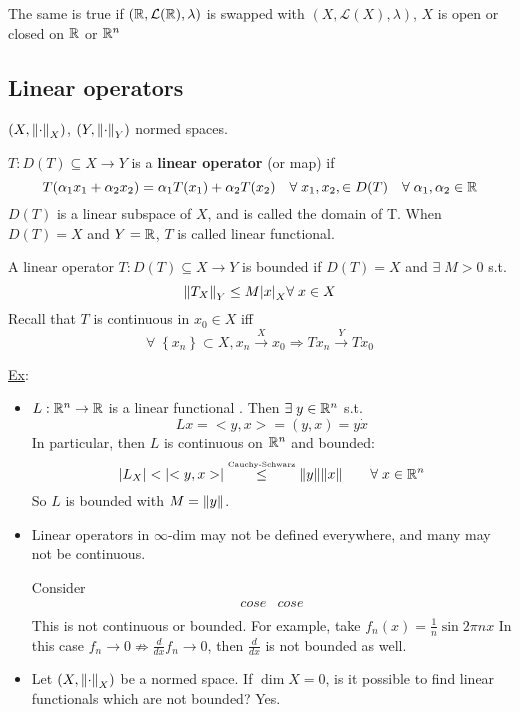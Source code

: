 \begin{remark}
    The same is true if \((\mathbb{R}, \mathcal{L}(\mathbb{R}), \lambda)\) is swapped with \((X, \mathcal{L}(X), \lambda)\), \(X\) is open or closed on \(\mathbb{R}\) or \(\mathbb{R}^n\)
\end{remark}

\subsection*{Linear operators}
\((X, \norm{\cdot}_X)\), \((Y, \norm{\cdot}_Y)\) normed spaces.
\begin{definition}
    \(T : D(T) \subseteq X \to Y\) is a \textbf{linear operator} (or map) if 
    \[
        T(\alpha_1 x_1 + \alpha_2 x_2) = \alpha_1 T(x_1) + \alpha_2 T(x_2) \quad \forall \; x_1, x_2, \in D(T) \quad \forall \; \alpha_1, \alpha_2 \in \mathbb{R}
    \]
    \(D(T)\) is a linear subspace of \(X\), and is called the domain of T. When \(D(T) = X\) and \(Y = \mathbb{R}\), \(T\) is called linear functional.
\end{definition}
\begin{definition}
    A linear operator \(T : D(T) \subseteq X \to Y\) is bounded if \(D(T) = X\) and \(\exists \; M >0\) s.t. 
    \[
        \norm{T_X}_Y \leq M \abs{x}_X \forall \; x \in X
    \]
    Recall that \(T\) is continuous in \(x_0 \in X\) iff 
    \[
        \forall \; \left\{ x_n \right\} \subset X, x_n \overset{X}{\to} x_0 \Rightarrow Tx_n \overset{Y}{\to} Tx_0
    \]
\end{definition}
\underline{Ex}:
\begin{itemize}
    \item \(L: \mathbb{R}^n \to \mathbb{R}\)  is a linear functional . Then \(\exists \; y \in \mathbb{R}^n\) s.t. 
    \[
        Lx = <y, x> = (y, x) = y \dot x
    \]
    In particular, then \(L\) is continuous on \(\mathbb{R}^n\) and bounded:
    \[
        \abs{L_X} < \abs{<y,x>} \overset{\text{\tiny{Cauchy-Schwarz}}}{\leq} \norm{y} \norm{x} \qquad \forall\; x \in \mathbb{R}^n
    \]
    So \(L\) is bounded with \(M=\norm{y}\).

    \item Linear operators in \(\infty\)-dim may not be defined everywhere, and many may not be continuous.
    
    Consider 
    \[
        \begin{array}{cc}
            cose & cose \\
        \end{array}
    \]
    This is not continuous or bounded. For example, take \(f_n(x) = \frac{1}{n} \sin{2\pi n x}\)
    In this case \(f_n \to 0 \nRightarrow \frac{d}{dx} f_n \to 0\), then \(\frac{d}{dx}\) is not bounded as well.
    \item Let \((X, \norm{\cdot}_X)\) be a normed space. If \(\dim X = 0\), is it possible to find linear functionals which are not bounded? Yes.
\end{itemize}
